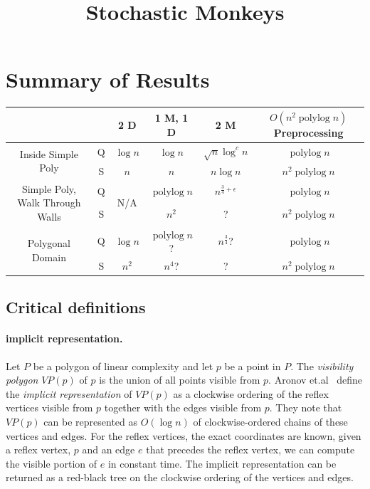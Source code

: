 \documentclass{article}
\title{Stochastic Monkeys}
\author{}
\date{}
\newcommand{\etal}{et.al\xspace}
\def\polylog{\operatorname{polylog}}
\begin{document}
\maketitle

\section{Summary of Results}

\begin{tabular}{|c|c|c|c|c|c|}
    \hline
     & & 2 D & 1 M, 1 D& 2 M & $O(n^2 \polylog n)$ Preprocessing \\
     \hline
     \multirow{2}{*}{Inside Simple Poly}
     & Q & $\log n$ & $\log n$ & $\sqrt{n} \log^c n$ & $\polylog n$ \\
     & S & $n$ & $n$ & $n \log n$ & $n^2 \polylog n$ \\
     \hline
     \multirow{2}{*}{Simple Poly, Walk Through Walls}
     & Q & \multirow{2}{*}{N/A} & $\polylog n$ & $n^{\frac{3}{4} + \epsilon}$ & $\polylog n$ \\
     & S &  & $n^2$ & ? & $n^2 \polylog n$ \\
     \hline
     \multirow{2}{*}{Polygonal Domain}
     & Q & $\log n$ & $\polylog n$? & $n^\frac{3}{4}$? & $\polylog n$ \\
     & S & $n^2$ & $n^4$? & ? & $n^2 \polylog n$ \\
     \hline
\end{tabular}

\subsection{Critical definitions}

\paragraph{implicit representation.}
\label{par:implicit}
Let $P$ be a polygon of linear complexity and let $p$ be a point in $P$. The \emph{visibility polygon} $VP(p)$ of $p$ is the union of all points visible from $p$. Aronov \etal~\cite{Aronov2002} define the \emph{implicit representation} of $VP(p)$ as a clockwise ordering of the reflex vertices visible from $p$ together with the edges visible from $p$. They note that $VP(p)$ can be represented as $O(\log n)$ of clockwise-ordered chains of these vertices and edges. For the reflex vertices, the exact coordinates are known, given a reflex vertex, $p$ and an edge $e$ that precedes the reflex vertex, we can compute the visible portion of $e$ in constant time. The implicit representation can be returned as a red-black tree on the clockwise ordering of the vertices and edges.
\end{document}
